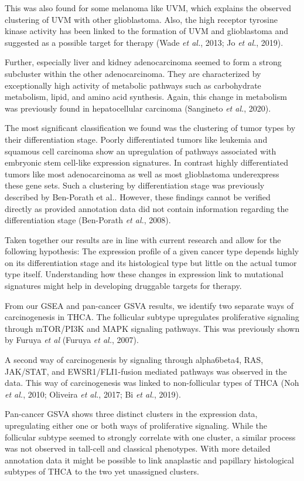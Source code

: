 \documentclass[
  parskip,
  oneside]{scrreprt}
\begin{document}
This was also found for some melanoma like UVM, which explains the
observed clustering of UVM with other glioblastoma. Also, the high
receptor tyrosine kinase activity has been linked to the formation of
UVM and glioblastoma and suggested as a possible target for therapy
(Wade \emph{et al.}, 2013; Jo \emph{et al.}, 2019).

Further, especially liver and kidney adenocarcinoma seemed to form a
strong subcluster within the other adenocarcinoma. They are
characterized by exceptionally high activity of metabolic pathways such
as carbohydrate metabolism, lipid, and amino acid synthesis. Again, this
change in metabolism was previously found in hepatocellular carcinoma
(Sangineto \emph{et al.}, 2020).

The most significant classification we found was the clustering of tumor
types by their differentiation stage. Poorly differentiated tumors like
leukemia and squamous cell carcinoma show an upregulation of pathways
associated with embryonic stem cell-like expression signatures. In
contrast highly differentiated tumors like most adenocarcinoma as well
as most glioblastoma underexpress these gene sets. Such a clustering by
differentiation stage was previously described by Ben-Porath et al..
However, these findings cannot be verified directly as provided
annotation data did not contain information regarding the
differentiation stage (Ben-Porath \emph{et al.}, 2008).

Taken together our results are in line with current research and allow
for the following hypothesis: The expression profile of a given cancer
type depends highly on its differentiation stage and its histological
type but little on the actual tumor type itself. Understanding how these
changes in expression link to mutational signatures might help in
developing druggable targets for therapy.

From our GSEA and pan-cancer GSVA results, we identify two separate ways
of carcinogenesis in THCA. The follicular subtype upregulates
proliferative signaling through mTOR/PI3K and MAPK signaling pathways.
This was previously shown by Furuya \textit{et al} (Furuya \emph{et
al.}, 2007).

A second way of carcinogenesis by signaling through alpha6beta4, RAS,
JAK/STAT, and EWSR1/FLI1-fusion mediated pathways was observed in the
data. This way of carcinogenesis was linked to non-follicular types of
THCA (Noh \emph{et al.}, 2010; Oliveira \emph{et al.}, 2017; Bi \emph{et
al.}, 2019).

Pan-cancer GSVA shows three distinct clusters in the expression data,
upregulating either one or both ways of proliferative signaling. While
the follicular subtype seemed to strongly correlate with one cluster, a
similar process was not observed in tall-cell and classical phenotypes.
With more detailed annotation data it might be possible to link
anaplastic and papillary histological subtypes of THCA to the two yet
unassigned clusters.
\end{document}
